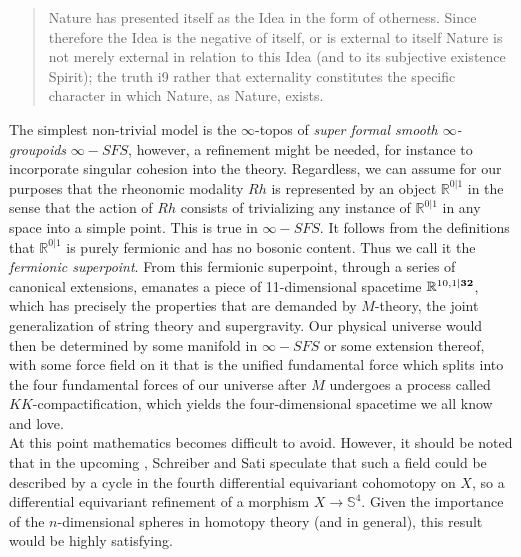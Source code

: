 \documentclass{article}
\begin{document}
\begin{quote}
    Nature has presented itself as the Idea in the form of otherness. Since therefore the Idea is the negative of itself, or is external to itself Nature is not merely external in relation to this Idea (and to its subjective existence Spirit); the truth i9 rather that externality constitutes the specific character in which Nature, as Nature, exists.
\end{quote}

The simplest non-trivial model is the $\infty$-topos of \emph{super formal smooth $\infty$-groupoids} $\infty-SFS$, however, a refinement might be needed, for instance to incorporate singular cohesion into the theory. Regardless, we can assume for our purposes that the rheonomic modality $Rh$ is represented by an object $\mathbb{R}^{0|1}$ in the sense that the action of $Rh$ consists of trivializing any instance of  $\mathbb{R}^{0|1}$ in any space into a simple point. This is true in $\infty-SFS$. It follows from the definitions that $\mathbb{R}^{0|1}$ is purely fermionic and has no bosonic content. Thus we call it the \emph{fermionic superpoint}. From this fermionic superpoint, through a series of canonical extensions, emanates a piece of 11-dimensional spacetime $\mathbb{R}^{10,1|\textrm{\textbf{32}}}$, which has precisely the properties that are demanded by $M$-theory, the joint generalization of string theory and supergravity. Our physical universe would then be determined by some manifold in $\infty-SFS$ or some extension thereof, with some force field on it that is the unified fundamental force which splits into the four fundamental forces of our universe after $M$ undergoes a process called $KK$-compactification, which yields the four-dimensional spacetime we all know and love. \\

At this point mathematics becomes difficult to avoid. However, it should be noted that in the upcoming \cite{SSS}, Schreiber and Sati speculate that such a field could be described by a cycle in the fourth differential equivariant cohomotopy on $X$, so a differential equivariant refinement of a morphism $X\rightarrow \mathbb{S}^4$. Given the importance of the $n$-dimensional spheres in homotopy theory (and in general), this result would be highly satisfying.
\end{document}
